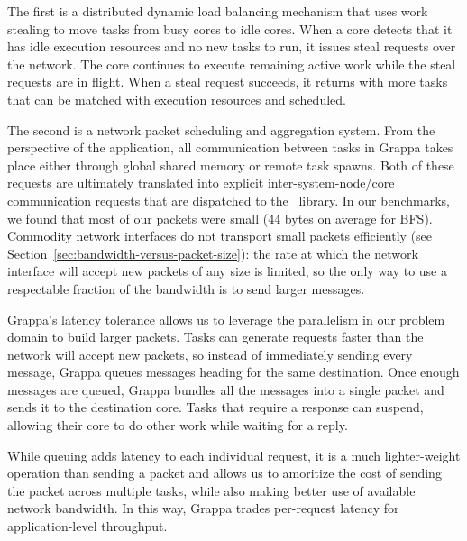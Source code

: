 The first is a distributed dynamic load balancing mechanism that uses
work stealing to move tasks from busy cores to idle cores. When a core
detects that it has idle execution resources and no new tasks to run, it
issues steal requests over the network. The core continues to execute
remaining active work while the steal requests are in flight. When a
steal request succeeds, it returns with more tasks that can be matched
with execution resources and scheduled.

The second is a network packet scheduling and aggregation system. From
the perspective of the application, all communication between tasks in
Grappa takes place either through global shared memory or remote task
spawns. Both of these requests are ultimately translated into explicit
inter-system-node/core communication requests that are dispatched to
the \gasnet~library. In our benchmarks, we found that most of our
packets were small (44 bytes on average for BFS). Commodity network
interfaces do not transport small packets efficiently (see
Section~\ref{sec:bandwidth-versus-packet-size}): the rate at which the
network interface will accept new packets of any size is limited, so
the only way to use a respectable fraction of the bandwidth is to send
larger messages. 

Grappa's latency tolerance allows us to leverage the parallelism in
our problem domain to build larger packets. Tasks can generate
requests faster than the network will accept new packets, so instead
of immediately sending every message, Grappa queues messages heading
for the same destination. Once enough messages are queued, Grappa
bundles all the messages into a single packet and sends it to the
destination core. Tasks that require a response can suspend, allowing
their core to do other work while waiting for a reply. 

While queuing adds latency to each individual request, it is a much
lighter-weight operation than sending a packet and allows us to
amoritize the cost of sending the packet across multiple tasks, while
also making better use of available network bandwidth. In this way,
Grappa trades per-request latency for application-level
throughput.
